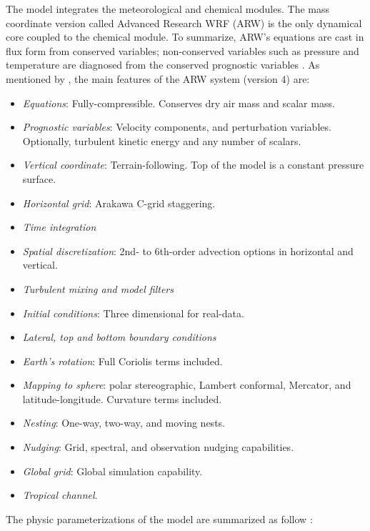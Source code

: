 The model integrates the meteorological and chemical modules. 
The mass coordinate version called Advanced Research WRF (ARW) is the only dynamical core coupled to the chemical module.
To summarize, ARW's equations are cast in flux form from conserved variables; non-conserved variables such as pressure and temperature are diagnosed from the conserved prognostic variables \citep{Grell2005,Skamarock2019}. 
As mentioned by \cite{Skamarock2019}, the main features of the ARW system (version 4) are:

\begin{itemize}
  \item \textit{Equations}: Fully-compressible. Conserves dry air mass and scalar mass.
  \item \textit{Prognostic variables}: Velocity components, and perturbation variables. Optionally, turbulent kinetic energy and any number of scalars.
  \item \textit{Vertical coordinate}: Terrain-following. Top of the model is a constant pressure surface.
  \item \textit{Horizontal grid}: Arakawa C-grid staggering.
  \item \textit{Time integration}
  \item \textit{Spatial discretization}: 2nd- to 6th-order advection options in horizontal and vertical.
  \item \textit{Turbulent mixing and model filters}
  \item \textit{Initial conditions}: Three dimensional for real-data.
  \item \textit{Lateral, top and bottom boundary conditions}
  \item \textit{Earth's rotation}: Full Coriolis terms included.
  \item \textit{Mapping to sphere}: polar stereographic, Lambert conformal, Mercator, and latitude-longitude. Curvature terms included.
  \item \textit{Nesting}: One-way, two-way, and moving nests.
  \item \textit{Nudging}: Grid, spectral, and observation nudging capabilities.
  \item \textit{Global grid}: Global simulation capability.
  \item \textit{Tropical channel}.
\end{itemize}

The physic parameterizations of the model are summarized as follow \cite{Skamarock2019}:

